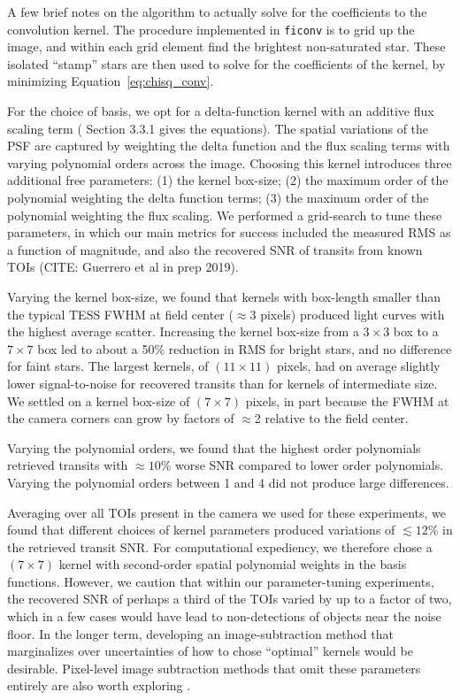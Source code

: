 \documentclass[12pt,twocolumn,tighten]{aastex62}
\begin{document}
A few brief notes on the algorithm to actually solve for the 
coefficients to the convolution kernel.
The procedure implemented in \texttt{ficonv} is to grid up
the image, and within each grid element find the brightest non-saturated
star. These isolated ``stamp'' stars are then used to solve for the
coefficients of the kernel, by minimizing
Equation~\ref{eq:chisq_conv}.

For the choice of basis, we opt for a delta-function kernel with an additive
flux scaling term (\citealt{soares-furtado_image_2017} Section 3.3.1
gives the equations).
The spatial variations of the PSF are captured by weighting the 
delta function and the flux scaling terms with varying
polynomial orders across the image.
Choosing this kernel introduces three additional
free parameters:
(1) the kernel box-size;
(2) the maximum order of the polynomial weighting the delta function terms;
(3) the maximum order of the polynomial weighting the flux scaling.
We performed a grid-search to tune these parameters, in
which our main metrics for success included the measured RMS as
a function of magnitude, and also the recovered SNR of transits from
known TOIs (CITE: Guerrero et al in prep 2019).

Varying the kernel box-size, we found that kernels with box-length smaller than the 
typical TESS FWHM at field center ($\approx$3 pixels) produced light curves
with the highest average scatter.
Increasing the kernel box-size from a $3\times3$ box to a $7\times7$ box led
to about a 50\% reduction in RMS for bright stars, and no difference for 
faint stars.
The largest kernels, of $(11\times11)$ pixels, had on average slightly lower 
signal-to-noise for recovered transits than for kernels of intermediate size.
We settled on a kernel box-size of $(7\times7)$ pixels, in part because the 
FWHM at the camera corners can grow by factors of $\approx$2 relative to the 
field center.

Varying the polynomial orders, we found that the highest order polynomials 
retrieved transits with $\approx10\%$ worse SNR compared to lower order
polynomials.
Varying the polynomial orders between 1 and 4 did not produce large 
differences.

Averaging over all TOIs present in the camera we used for these experiments, 
we found that different choices 
of kernel parameters produced variations of $\lesssim 12\%$ in the retrieved 
transit SNR.  
For computational expediency, we therefore chose a $(7\times 7)$ kernel with 
second-order spatial polynomial weights in the basis functions.
However, we caution that within our parameter-tuning experiments, the 
recovered SNR of perhaps a third of the TOIs varied by up to a factor of two,
which in a few 
cases would have lead to non-detections of objects near the noise floor.
In the longer term, developing an image-subtraction method that marginalizes 
over uncertainties of how to chose ``optimal'' kernels would be desirable.
Pixel-level image subtraction methods that omit these 
parameters entirely 
are also worth exploring \citep{wang_pixel-level_2017}.
\end{document}
